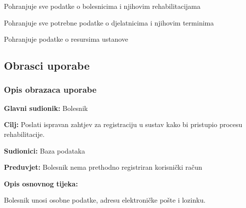 \begin{packed_enum}
\begin{packed_enum}
	\end{packed_enum}

	\item {}

	\begin{packed_enum}

		\item Pohranjuje sve podatke o bolesnicima i njihovim rehabilitacijama
		\item Pohranjuje sve potrebne podatke o djelatnicima i njihovim terminima
       		\item Pohranjuje podatke o resursima ustanove 

	\end{packed_enum}
\end{packed_enum}

\eject



\subsection{Obrasci uporabe}


\subsubsection{Opis obrazaca uporabe}
\vspace{2em} %
	\item \textbf{Glavni sudionik:} Bolesnik
	\item \textbf{Cilj:} Poslati ispravan zahtjev za registraciju u sustav kako bi pristupio procesu rehabilitacije.
	\item \textbf{Sudionici:} Baza podataka
	\item \textbf{Preduvjet:} Bolesnik nema prethodno registriran korisnički račun
	\item \textbf{Opis osnovnog tijeka:}
	\begin{packed_enum}
		\item Bolesnik unosi osobne podatke, adresu elektroničke pošte i lozinku.
	\end{packed_enum}
\closeusecase



